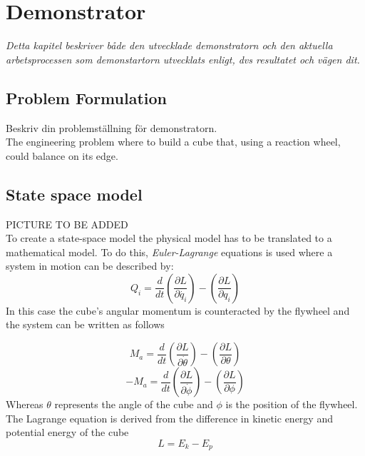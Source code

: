 \documentclass[a4paper,11pt]{kth-mag}
\begin{document}
\chapter{Demonstrator}
\emph{Detta kapitel beskriver både den utvecklade demonstratorn och den aktuella arbetsprocessen som demonstartorn utvecklats enligt, dvs resultatet och vägen dit.}


\section{Problem Formulation}
Beskriv din problemställning för demonstratorn.\\

The engineering problem where to build a cube that, using a reaction wheel, could balance on its edge.

\section{State space model}
PICTURE TO BE ADDED
\\
To create a state-space model the physical model has to be translated to a mathematical model. To do this, \emph{Euler-Lagrange} equations is used where a system in motion can be described by:
\begin{equation}
Q_i=\frac{d}{dt}\left(\frac{\partial L}{\partial \dot{q_i}}\right)-\left(\frac{\partial L}{\partial q_i}\right)
\end{equation}
In this case the cube's angular momentum is counteracted by the flywheel and the system can be written as follows

\begin{equation} \label{eq:positiveL}
M_a=\frac{d}{dt}\left(\frac{\partial L}{\partial \dot{\theta}}\right)-\left(\frac{\partial L}{\partial \theta}\right)
\end{equation}
\begin{equation} \label{eq:negativeL}
-M_a=\frac{d}{dt}\left(\frac{\partial L}{\partial \dot{\phi}}\right)-\left(\frac{\partial L}{\partial \phi}\right)
\end{equation}
Whereas $\theta$ represents the angle of the cube and $\phi$ is the position of the flywheel. \\
The Lagrange equation is derived from the difference in kinetic energy and potential energy of the cube
\begin{equation} \label{eq:Lagrange}
L = E_k - E_p
\end{equation}
\end{document}
